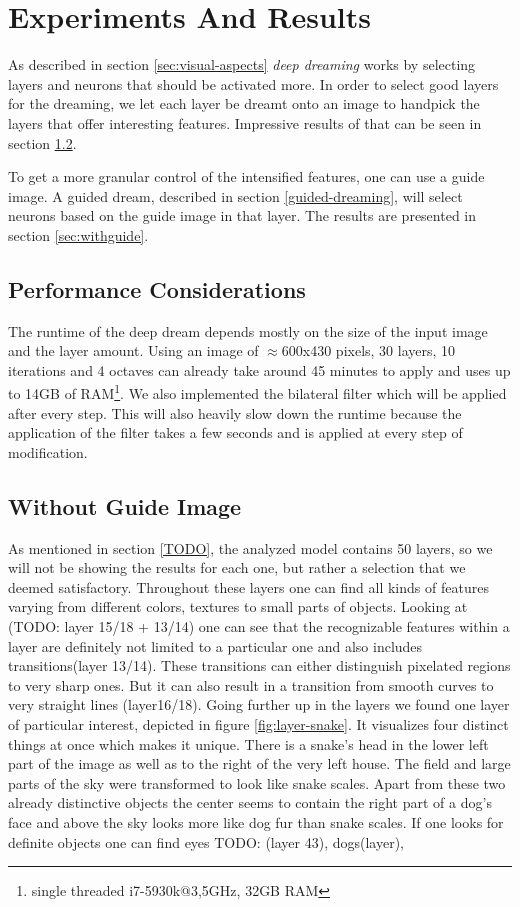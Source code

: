 \section{Experiments And Results}
\label{sec:evaluation}
As described in section \ref{sec:visual-aspects} \emph{deep dreaming} works by selecting layers and neurons that should be activated more.
In order to select good layers for the dreaming, we let each layer be dreamt onto an image to handpick the layers that offer interesting features.
Impressive results of that can be seen in section \ref{sec:withoutguide}.

To get a more granular control of the intensified features, one can use a guide image.
A guided dream, described in section \ref{guided-dreaming}, will select neurons based on the guide image in that layer.
The results are presented in section \ref{sec:withguide}.


\subsection{Performance Considerations}
The runtime of the deep dream depends mostly on the size of the input image and the layer amount.
Using an image of $\approx$600x430 pixels, 30 layers, 10 iterations and 4 octaves can already take around 45 minutes to apply and uses up to 14GB of RAM\footnote{single threaded i7-5930k@3,5GHz, 32GB RAM}.
We also implemented the bilateral filter which will be applied after every step.\cite{TODO}
This will also heavily slow down the runtime because the application of the filter takes a few seconds and is applied at every step of modification.


\subsection{Without Guide Image}
\label{sec:withoutguide}

As mentioned in section \ref{TODO}, the analyzed model contains 50 layers, so we will not be showing the results for each one, but rather a selection that we deemed satisfactory.
Throughout these layers one can find all kinds of features varying from different colors, textures to small parts of objects.
Looking at (TODO: layer 15/18 + 13/14) one can see that the recognizable features within a layer are definitely not limited to a particular one and also includes transitions(layer 13/14).
These transitions can either distinguish pixelated regions to very sharp ones.
But it can also result in a transition from smooth curves to very straight lines (layer16/18).
Going further up in the layers we found one layer of particular interest, depicted in figure \ref{fig:layer-snake}.
It visualizes four distinct things at once which makes it unique.
There is a snake's head in the lower left part of the image as well as to the right of the very left house.
The field and large parts of the sky were transformed to look like snake scales.
Apart from these two already distinctive objects the center seems to contain the right part of a dog's face and above the sky looks more like dog fur than snake scales.  
If one looks for definite objects one can find eyes TODO: (layer 43), dogs(layer), 

